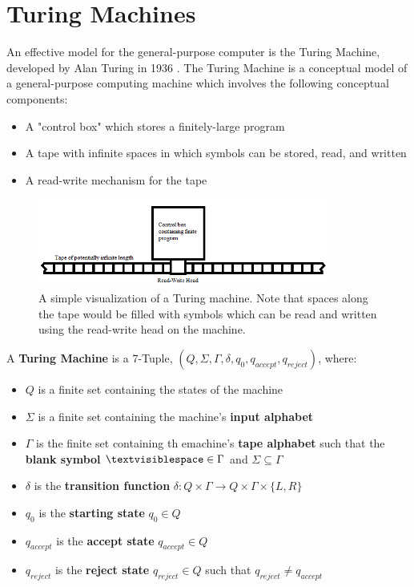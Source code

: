 \documentclass{article}
\begin{document}
\section{Turing Machines}
An effective model for the general-purpose computer is the Turing Machine, developed by Alan Turing in 1936 \cite{2}.  The Turing Machine is a conceptual model of a general-purpose computing machine which involves the following conceptual components:
\begin{itemize}
	\item A "control box" which stores a finitely-large program
	\item A tape with infinite spaces in which symbols can be stored, read, and written
	\item A read-write mechanism for the tape \cite{3}
\end{itemize}
\begin{figure}[h]
	\includegraphics[width=0.85\textwidth]{figure-3-1}
	\centering
	\setlength{\belowcaptionskip}{-10pt}
	\caption{A simple visualization of a Turing machine.  Note that spaces along the tape would be filled with symbols which can be read and written using the read-write head on the machine.}
\end{figure}
\begin{defin}
	A \textbf{Turing Machine} is a 7-Tuple, $(Q, \Sigma, \Gamma, \delta, q_{0}, q_{accept}, q_{reject})$, where:
\end{defin}
\begin{itemize}
	\item $Q$ is a finite set containing the states of the machine
	\item $\Sigma$ is a finite set containing the machine's \textbf{input alphabet}
	\item $\Gamma$ is the finite set containing th emachine's \textbf{tape alphabet} such that the \textbf{blank symbol} $\textvisiblespace \in \Gamma$ and $\Sigma \subseteq \Gamma$
	\item $\delta$ is the \textbf{transition function} $\delta: Q \times \Gamma \to Q \times \Gamma \times \{L, R\}$
	\item $q_{0}$ is the \textbf{starting state} $q_{0} \in Q$
	\item $q_{accept}$ is the \textbf{accept state} $q_{accept} \in Q$
	\item $q_{reject}$ is the \textbf{reject state} $q_{reject} \in Q$ such that $q_{reject} \neq q_{accept}$
\end{itemize}
\end{document}

